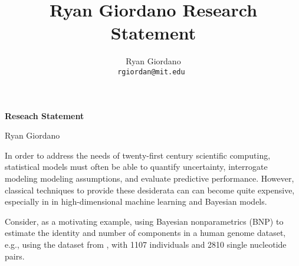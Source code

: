 
\usepackage{enumitem}

\geometry{margin=1.2in}


\title{Ryan Giordano Research Statement}

\author{
  Ryan Giordano \\ \texttt{rgiordan@mit.edu }
}



\begin{minipage}[t]{0.5\textwidth}
\hspace{-2em} %
{\bf \LARGE Reseach Statement}\\
\end{minipage}
\begin{minipage}[t]{0.5\textwidth}
        \hspace{4.5em} %
        {\LARGE Ryan Giordano}
\end{minipage}


In order to address the needs of twenty-first century scientific computing,
statistical models must often be able to quantify uncertainty, interrogate
modeling modeling assumptions, and evaluate predictive performance. However,
classical techniques to provide these desiderata can can become quite expensive,
especially in in high-dimensional machine learning and Bayesian models.

Consider, as a motivating example, using Bayesian nonparametrics (BNP)  to
estimate the identity and number of components in a human genome dataset, e.g.,
using the dataset from \citet{huang:2011:haplotype}, with 1107 individuals and
2810 single nucleotide pairs.


